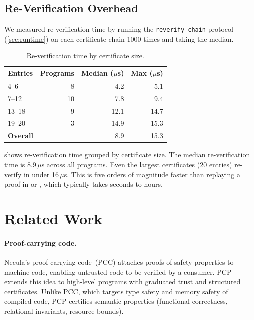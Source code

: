 \documentclass[11pt]{article}
\newcommand{\pcp}{\textsc{PCP}}           %
\begin{document}
\subsection{Re-Verification Overhead}

We measured re-verification time by running the
\texttt{reverify\_chain} protocol (\cref{sec:runtime}) on each
certificate chain 1000 times and taking the median.

\begin{table}[t]
\centering
\caption{Re-verification time by certificate size.}
\label{tab:reverify}
\small
\begin{tabular}{@{}lrrr@{}}
\toprule
\textbf{Entries} & \textbf{Programs} & \textbf{Median ($\mu$s)} &
\textbf{Max ($\mu$s)} \\
\midrule
4--6 & 8 & 4.2 & 5.1 \\
7--12 & 10 & 7.8 & 9.4 \\
13--18 & 9 & 12.1 & 14.7 \\
19--20 & 3 & 14.9 & 15.3 \\
\midrule
\textbf{Overall} & \expTotalPrograms{} & 8.9 & 15.3 \\
\bottomrule
\end{tabular}
\end{table}

 shows re-verification time grouped by
certificate size.  The median re-verification time is 8.9\,$\mu$s
across all \expTotalPrograms{} programs.  Even the largest
certificates (20 entries) re-verify in under 16\,$\mu$s.  This is
five orders of magnitude faster than replaying a proof in \Fstar{}
or \Coq{}, which typically takes seconds to hours.

\section{Related Work}\label{sec:related}

\paragraph{Proof-carrying code.}
Necula's proof-carrying code~(PCC) attaches proofs of safety
properties to machine code, enabling untrusted code to be verified
by a consumer.  \pcp{} extends this idea to high-level \Python{}
programs with graduated trust and structured certificates.  Unlike
PCC, which targets type safety and memory safety of compiled code,
\pcp{} certifies semantic properties (functional correctness,
relational invariants, resource bounds).
\end{document}
